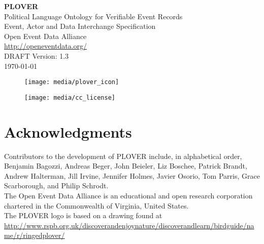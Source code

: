 \documentclass[11pt]{report}
\begin{document}

\vspace{-10pt}	

      \begin{center}
            {\Huge \bfseries PLOVER\ }\\[2ex]
            {\LARGE Political Language Ontology for Verifiable Event Records\\ [2ex]Event, Actor and Data Interchange Specification}\\[10ex]
            {\LARGE Open Event Data Alliance} \\[2ex]
            {\Large \url{http://openeventdata.org/} }\\[2ex]
            {\LARGE DRAFT Version: 1.3\\ [2EX]\monthyeardate\today}
        \end{center}


\begin{figure}[h!]
\centering
\texttt{[image: media/plover\_icon]}
\end{figure}

\vspace{20pt}	


\begin{figure}[h!]
\centering
\texttt{[image: media/cc\_license]}
\end{figure}






\chapter*{Acknowledgments}

\noindent Contributors to the development of PLOVER include, in alphabetical order, Benjamin Bagozzi, Andreas Beger, John Beieler, Liz Boschee, Patrick Brandt, Andrew Halterman, Jill Irvine, Jennifer Holmes, Javier Osorio, Tom Parris, Grace Scarborough, and Philip Schrodt.\\

\noindent The Open Event Data Alliance is an educational and open research corporation chartered in the Commonwealth of Virginia, United States.\\

\noindent The PLOVER logo is based on a drawing found at\\ {\footnotesize \url{http://www.rspb.org.uk/discoverandenjoynature/discoverandlearn/birdguide/name/r/ringedplover/}}\\
\end{document}
